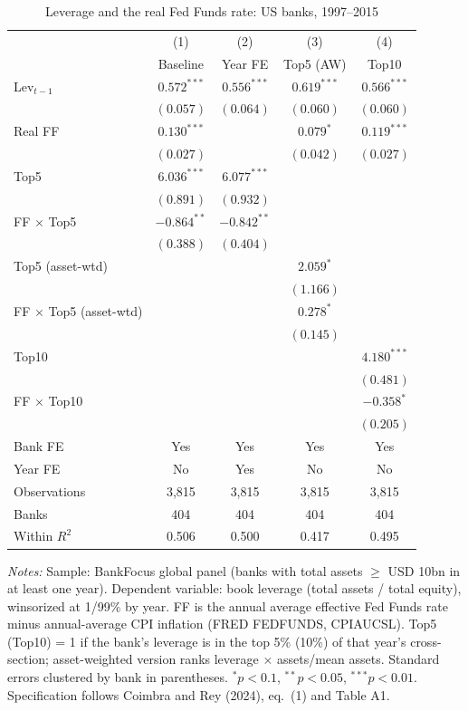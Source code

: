 \documentclass[11pt]{article}
\begin{document}
\begin{table}[htbp]
\centering
\small
\begin{threeparttable}
\caption{Leverage and the real Fed Funds rate: US banks, 1997--2015}
\label{tab:cr_eq1_1}
\begin{tabular}{lcccc}
\toprule
 & (1) & (2) & (3) & (4) \\
 & Baseline & Year FE & Top5 (AW) & Top10 \\
\midrule
Lev$_{t-1}$ & $0.572^{***}$ & $0.556^{***}$ & $0.619^{***}$ & $0.566^{***}$ \\
 & $(0.057)$ & $(0.064)$ & $(0.060)$ & $(0.060)$ \\[2pt]
Real FF & $0.130^{***}$ &  & $0.079^{*}$ & $0.119^{***}$ \\
 & $(0.027)$ &  & $(0.042)$ & $(0.027)$ \\[2pt]
Top5 & $6.036^{***}$ & $6.077^{***}$ &  &  \\
 & $(0.891)$ & $(0.932)$ &  &  \\[2pt]
FF $\times$ Top5 & $-0.864^{**}$ & $-0.842^{**}$ &  &  \\
 & $(0.388)$ & $(0.404)$ &  &  \\[2pt]
Top5 (asset-wtd) &  &  & $2.059^{*}$ &  \\
 &  &  & $(1.166)$ &  \\[2pt]
FF $\times$ Top5 (asset-wtd) &  &  & $0.278^{*}$ &  \\
 &  &  & $(0.145)$ &  \\[2pt]
Top10 &  &  &  & $4.180^{***}$ \\
 &  &  &  & $(0.481)$ \\[2pt]
FF $\times$ Top10 &  &  &  & $-0.358^{*}$ \\
 &  &  &  & $(0.205)$ \\
\midrule
Bank FE & Yes & Yes & Yes & Yes \\
Year FE & No & Yes & No & No \\
Observations & 3,815 & 3,815 & 3,815 & 3,815 \\
Banks & 404 & 404 & 404 & 404 \\
Within $R^2$ & 0.506 & 0.500 & 0.417 & 0.495 \\
\bottomrule
\end{tabular}
\begin{tablenotes}[flushleft]
\footnotesize
\item \textit{Notes:} Sample: BankFocus global panel (banks with total assets $\geq$ USD 10bn in at least one year). Dependent variable: book leverage (total assets / total equity), winsorized at 1/99\% by year. FF is the annual average effective Fed Funds rate minus annual-average CPI inflation (FRED FEDFUNDS, CPIAUCSL). Top5 (Top10) = 1 if the bank's leverage is in the top 5\% (10\%) of that year's cross-section; asset-weighted version ranks leverage $\times$ assets/mean assets. Standard errors clustered by bank in parentheses. $^{*}p<0.1$, $^{**}p<0.05$, $^{***}p<0.01$. Specification follows Coimbra and Rey (2024), eq.~(1) and Table A1.
\end{tablenotes}
\end{threeparttable}
\end{table}
\end{document}
